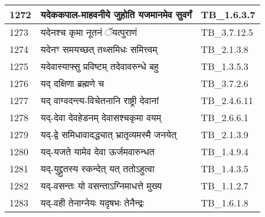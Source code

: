 \documentclass[17pt]{extarticle}
\begin{document}
\begin{longtable}{||p{0.4in}||p{4.9in}||p{0.9in}||}
    1272 & यदेककपाल{-}माहवनीये जुहोति यजमानमेव सुवर्गं & TB\_1.6.3.7       \\
    
    \hline
        
    1273 & यदेनश्च कृमा नूतनं ॅयत्पुराणं & TB\_3.7.12.5       \\
    
    \hline
        
    1274 & यदेनꣳ समयच्छत् तथ्समिधः समित्त्वम् & TB\_2.1.3.8       \\
    
    \hline
        
    1275 & यदेवास्याफ्सु प्रविष्टम् तदेवावरुन्धे बहु & TB\_1.3.5.3       \\
    
    \hline
        
    1276 & यद् दक्षिणा ब्रह्मणे च & TB\_3.7.2.6       \\
    
    \hline
        
    1277 & यद् वाग्वदन्त्य{-}विचेतनानि राष्ट्री देवानां & TB\_2.4.6.11       \\
    
    \hline
        
    1278 & यद्{-}देवा देवहेडनम् देवासश्चकृमा वयम् & TB\_2.6.6.1       \\
    
    \hline
        
    1279 & यद्{-}द्वे समिधावादद्ध्यात् भ्रातृव्यमस्मै जनयेत् & TB\_2.1.3.9       \\
    
    \hline
        
    1280 & यद्{-}यजते यामेव देवा ऊर्जमवारुन्धत & TB\_1.4.9.4       \\
    
    \hline
        
    1281 & यद्{-}युद्द्रुतस्य स्कन्देत् यत् ततोऽहुत्वा & TB\_1.4.3.5       \\
    
    \hline
        
    1282 & यद्{-}वसन्तः यो वसन्ताऽग्निमाधत्ते मुख्य & TB\_1.1.2.7       \\
    
    \hline
        
    1283 & यद्{-}वही तेनाग्नेयः यदृषभः तेनैन्द्रः & TB\_1.6.1.8       \\
    
    \hline
        

\end{longtable}
\end{document}
